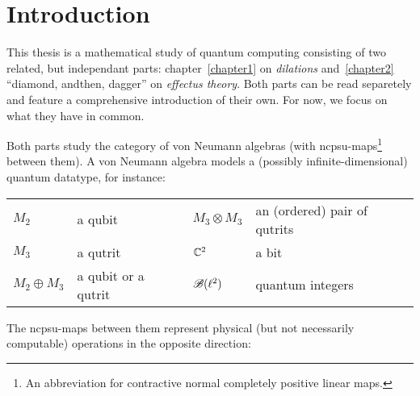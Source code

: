 \documentclass[b]{subfiles}
\begin{document}
\chapter{Introduction}
\begin{parsec}%
\begin{point}%
This thesis is a mathematical study of quantum computing consisting
    of two related, but independant parts:
    chapter~\ref{chapter1} on \emph{dilations} and~\ref{chapter2}
    ``diamond, andthen, dagger'' on \emph{effectus theory}.
Both parts can be read separetely
    and feature a comprehensive introduction of their own.
For now, we focus on what they have in common.
\begin{point}%
Both parts study the category of von Neumann algebras
    (with ncpsu-maps\footnote{%
        An abbreviation for contractive normal completely
        positive linear maps.} between them).
A von Neumann algebra models a (possibly infinite-dimensional)
    quantum datatype, for instance:
\begin{center}
    \begin{tabular}{llll}
        $M_2$ & a qubit & $M_3 \otimes M_3$ & an (ordered) pair of qutrits \\
        $M_3$ & a qutrit & $\mathbb{C}^2$ & a bit \\
        $M_2 \oplus M_3$ & a qubit or a qutrit
        & $\mathscr{B}(\ell^2)$ & quantum integers
\end{tabular}
\end{center}
The ncpsu-maps between them represent physical
    (but not necessarily computable) operations
        in the opposite direction:
\end{point}
\end{point}
\end{parsec}
\end{document}
